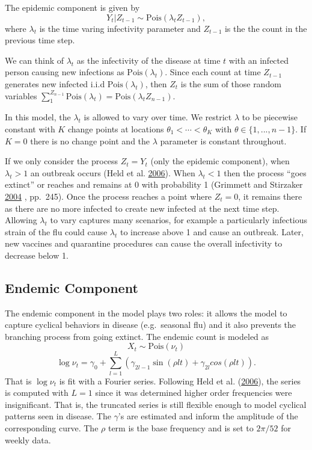 \documentclass[11pt,a4paper]{article}
\begin{document}
The epidemic component is given by
\[Y_t|Z_{t-1} \sim\text{Pois}(\lambda_tZ_{t-1}),\] where \(\lambda_t\)
is the time varing infectivity parameter and \(Z_{t-1}\) is the the
count in the previous time step.

We can think of \(\lambda_t\) as the infectivity of the disease at time
\(t\) with an infected person causing new infections as
\(\text{Pois}(\lambda_t)\). Since each count at time \(Z_{t-1}\)
generates new infected i.i.d \(\text{Pois}(\lambda_t)\), then \(Z_t\) is
the sum of those random variables
\(\sum_1^{Z_{n-1}}\text{Pois}(\lambda_t) =\text{Pois}(\lambda_tZ_{n-1})\).

In this model, the \(\lambda_t\) is allowed to vary over time. We
restrict \(\lambda\) to be piecewise constant with \(K\) change points
at locations \(\theta_1 < \cdots < \theta_K\) with
\(\theta \in \{1,...,n-1\}\). If \(K = 0\) there is no change point and
the \(\lambda\) parameter is constant throughout.

If we only consider the process \(Z_t = Y_t\) (only the epidemic
component), when \(\lambda_t > 1\) an outbreak occurs (Held et al.
\protect\hyperlink{ref-held_two-component_2006}{2006}). When
\(\lambda_t < 1\) then the process ``goes extinct'' or reaches and
remains at 0 with probability 1 (Grimmett and Stirzaker
\protect\hyperlink{ref-grimmett_probability_2004}{2004} , pp.~245). Once
the process reaches a point where \(Z_t = 0\), it remains there as there
are no more infected to create new infected at the next time step.
Allowing \(\lambda_t\) to vary captures many scenarios, for example a
particularly infectious strain of the flu could cause \(\lambda_t\) to
increase above 1 and cause an outbreak. Later, new vaccines and
quarantine procedures can cause the overall infectivity to decrease
below 1.

\hypertarget{endemic-component}{%
\subsection{Endemic Component}\label{endemic-component}}

The endemic component in the model plays two roles: it allows the model
to capture cyclical behaviors in disease (e.g.~seasonal flu) and it also
prevents the branching process from going extinct. The endemic count is
modeled as \[X_t \sim \text{Pois}(\nu_t)\]
\[\log{\nu_t} = \gamma_0 + \sum_{l = 1}^L (\gamma_{2l-1}\sin(\rho l t)+\gamma_{2l}cos(\rho l t)).\]
That is \(\log{\nu_t}\) is fit with a Fourier series. Following Held et
al. (\protect\hyperlink{ref-held_two-component_2006}{2006}), the series
is computed with \(L = 1\) since it was determined higher order
frequencies were insignificant. That is, the truncated series is still
flexible enough to model cyclical patterns seen in disease. The
\(\gamma\)'s are estimated and inform the amplitude of the corresponding
curve. The \(\rho\) term is the base frequency and is set to \(2\pi/52\)
for weekly data.
\end{document}
